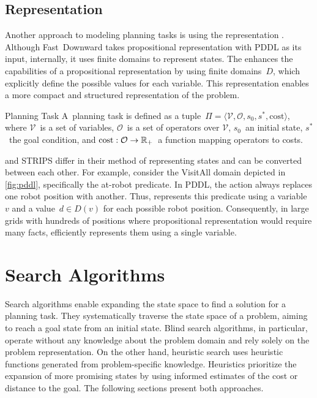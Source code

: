 \subsection{\sas Representation}
\label{sec:sasplus}

Another approach to modeling planning tasks is using the \sas representation \cite{backstrom1995complexity}. Although Fast~Downward takes propositional representation with PDDL as its input, internally, it uses finite domains to represent states. The \sas enhances the capabilities of a propositional representation by using finite domains~$D$, which explicitly define the possible values for each variable. This representation enables a more compact and structured representation of the problem.

\begin{definition}{\sas Planning Task}
    \label{def:sasplus}
    A~\sas planning task is defined as a tuple~$\Pi=\langle\mathcal{V},\mathcal{O},s_0,s^*, \text{cost}\rangle$, where $\mathcal{V}$~is a set of variables, $\mathcal{O}$~is a set of operators over $\mathcal{V}$, $s_0$~an initial state, $s^*$~the goal condition, and $\text{cost}:\mathcal{O}\rightarrow\mathbb{R}_{+}$~a function mapping operators to costs.
\end{definition}

\sas and STRIPS differ in their method of representing states and can be converted between each other. For example, consider the VisitAll domain depicted in \cref{fig:pddl}, specifically the at-robot predicate. In PDDL, the action always replaces one robot position with another. Thus, \sas represents this predicate using a variable~$v$ and a value~$d \in D(v)$ for each possible robot position. Consequently, in large grids with hundreds of positions where propositional representation would require many facts, \sas efficiently represents them using a single variable.

\section{Search Algorithms}
\label{sec:search-algorithms}

Search algorithms enable expanding the state space to find a solution for a planning task. They systematically traverse the state space of a problem, aiming to reach a goal state from an initial state. Blind search algorithms, in particular, operate without any knowledge about the problem domain and rely solely on the problem representation. On the other hand, heuristic search uses heuristic functions generated from problem-specific knowledge. Heuristics prioritize the expansion of more promising states by using informed estimates of the cost or distance to the goal. The following sections present both approaches.

